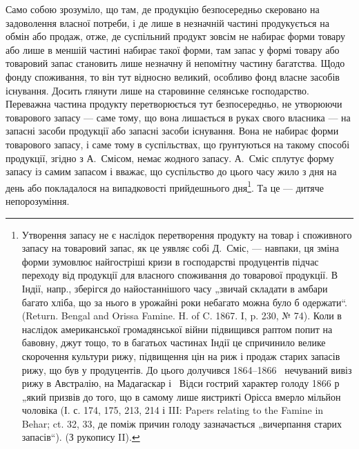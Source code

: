 Само собою зрозуміло, що там, де продукцію безпосередньо скеровано
на задоволення власної потреби, і де лише в незначній частині
продукується на обмін або продаж, отже, де суспільний продукт зовсім
не набирає форми товару або лише в меншій частині набирає такої форми,
там запас у формі товару або товаровий запас становить лише незначну
й непомітну частину багатства. Щодо фонду споживання, то він
тут відносно великий, особливо фонд власне засобів існування. Досить
глянути лише на старовинне селянське господарство. Переважна частина продукту
перетворюється тут безпосередньо, не утворюючи товарового запасу
— саме тому, що вона лишається в руках свого власника — на запасні
засоби продукції або запасні засоби існування. Вона не набирає форми
товарового запасу, і саме тому в суспільствах, що ґрунтуються на такому
способі продукції, згідно з А.~Смісом, немає жодного запасу. А.~Сміс
сплутує форму запасу із самим запасом і вважає, що суспільство до
цього часу жило з дня на день або покладалося на випадковості прийдешнього
дня\footnote{
Утворення\label{original-94} запасу не є наслідок перетворення продукту на товар і споживного запасу на товаровий
запас, як це уявляє собі Д.~Сміс, — навпаки,
ця зміна форми зумовлює найгостріші кризи в господарстві продуцентів підчас
переходу від продукції для власного споживання до товарової продукції. В Індії,
напр., зберігся до найостаннішого часу „звичай складати в амбари багато хліба, що
за нього в урожайні роки небагато можна було б одержати“. (Return. Bengal and
Orissa Famine. H. of C. 1867. I, p. 230, № 74). Коли в наслідок американської
громадянської війни підвищився раптом попит на бавовну, джут тощо, то в багатьох
частинах Індії це спричинило велике скорочення культури рижу, підвищення цін
на риж і продаж старих запасів рижу, що був у продуцентів. До цього долучився
1864--1866~ нечуваний вивіз рижу в Австралію, на Мадагаскар і~ Відси
гострий характер голоду 1866 р „який призвів до того, що в самому лише
яистрикті Орісса вмерло мільйон чоловіка (І. с. 174, 175, 213, 214 і III: Papers relating
to the Famine in Behar; ct. 32, 33, де поміж причин голоду зазначається „вичерпання старих запасів“).
(З рукопису II).
}. Та це — дитяче непорозуміння.
